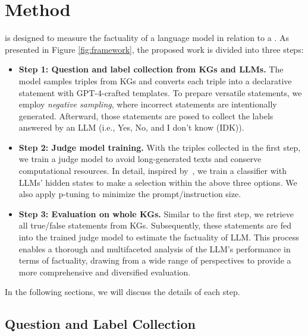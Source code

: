 


\section{Method}

\GraphEval{} is designed to measure the factuality of a language model in relation to a . As presented in Figure \ref{fig:framework}, the proposed work is divided into three steps: 
\begin{itemize}[topsep=0pt,itemsep=0pt,parsep=0pt,partopsep=0pt,leftmargin=*]
    \item \textbf{Step 1: Question and label collection from KGs and LLMs. } \quad  The model samples triples from KGs and converts each triple into a declarative statement with GPT-4-crafted templates. To prepare versatile statements, we employ \textit{negative sampling}, where incorrect statements are intentionally generated. Afterward, those statements are posed to collect the labels answered by an LLM (i.e., Yes, No, and I don't know (IDK)).
    \item \textbf{Step 2: Judge model training.} \quad With the triples collected in the first step, we train a judge model to avoid long-generated texts and conserve computational resources. In detail, inspired by~\cite{azaria-mitchell-2023-internal}, we train a classifier with LLMs' hidden states to make a selection within the above three options. We also apply p-tuning \cite{liu2021p} to minimize the prompt/instruction size.
    \item \textbf{Step 3: Evaluation on whole KGs.} \quad Similar to the first step, we retrieve all true/false statements from KGs. Subsequently, these statements are fed into the trained judge model to estimate the factuality of LLM. This process enables a thorough and multifaceted analysis of the LLM's performance in terms of factuality, drawing from a wide range of perspectives to provide a more comprehensive and diversified evaluation.
\end{itemize}
In the following sections, we will discuss the details of each step. 

\subsection{Question and Label Collection}
\label{sec:question_generation}

